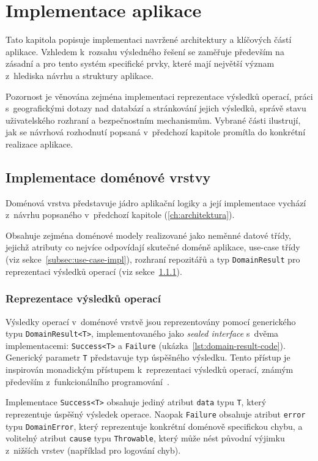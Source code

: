 \chapter{Implementace aplikace}
Tato kapitola popisuje implementaci navržené architektury a klíčových částí aplikace.
Vzhledem k~rozsahu výsledného řešení se zaměřuje především na zásadní a pro tento systém specifické prvky, které mají největší význam z~hlediska návrhu a struktury aplikace.

Pozornost je věnována zejména implementaci reprezentace výsledků operací, práci s~geografickými dotazy nad databází a stránkování jejich výsledků, správě stavu uživatelského rozhraní a bezpečnostním mechanismům.
Vybrané části ilustrují, jak se návrhová rozhodnutí popsaná v~předchozí kapitole promítla do konkrétní realizace aplikace.


\section{Implementace doménové vrstvy}
Doménová vrstva představuje jádro aplikační logiky a její implementace vychází z~návrhu popsaného v~předchozí kapitole (\ref{ch:architektura}).

Obsahuje zejména doménové modely realizované jako neměnné datové třídy, jejichž atributy co nejvíce odpovídají skutečné doméně aplikace, use-case třídy (viz sekce~\ref{subsec:use-case-impl}), rozhraní repozitářů a typ \texttt{Domain\-Result} pro reprezentaci výsledků operací (viz sekce~\ref{subsec:domain-result-impl}).

\subsection{Reprezentace výsledků operací}\label{subsec:domain-result-impl}
Výsledky operací v~doménové vrstvě jsou reprezentovány pomocí generického typu \texttt{Domain\-Result<T>}, implementovaného jako \textit{sealed interface} s~dvěma implementacemi: \texttt{Success<T>} a \texttt{Failure} (ukázka~\ref{lst:domain-result-code}).
Generický parametr \texttt{T} představuje typ úspěšného výsledku.
Tento přístup je inspirován monadickým přístupem k~reprezentaci výsledků operací, známým především z~funkcionálního programování~\parencite{wadler_monads}.

Implementace \texttt{Success<T>} obsahuje jediný atribut \texttt{data} typu \texttt{T}, který reprezentuje úspěšný výsledek operace.
Naopak \texttt{Failure} obsahuje atribut \texttt{error} typu \texttt{Domain\-Error}, který reprezentuje konkrétní doménově specifickou chybu, a volitelný atribut \texttt{cause} typu \texttt{Throwable}, který může nést původní výjimku z~nižších vrstev (například pro logování chyb).

